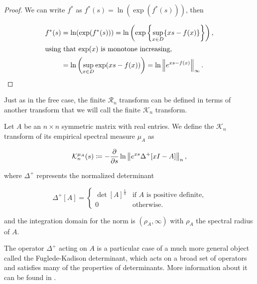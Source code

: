 \begin{proof}
    We can write $f^*$ as $f^*(s) = \ln(\exp(f^*(s)))$, then

    \begin{align*}
        f^*(s) &= \ln(\exp(f^*(s))) = \ln \left(\exp\left\{ \sup_{x\in D} \{xs-f(x)\} \right\}\right), \\
        \intertext{using that $\exp(x)$ is monotone increasing,}
        &= \ln \left( \sup_{x \in D} \exp(xs - f(x))\right) = \ln \left\lVert e^{xs-f(x)} \right\rVert_{\infty}.
    \end{align*}
\end{proof}


Just as in the free case, the finite $\mathcal R_n$ transform can be defined in terms of another transform that we will call the finite $\mathcal K_n$ transform.


\begin{definition}
    Let $A$ be an $n\times n$ symmetric matrix with real entries. We define the $\mathcal K_n$ transform of its empirical spectral measure $\mu_A$ as 

    \begin{equation*}
        \mathcal K_n^{\mu_A} (s) \coloneqq - \frac{\partial}{\partial s} \ln \left\lVert e^{xs} \Delta^+ [x I - A] \right\rVert_n,
    \end{equation*}

    \noindent where $\Delta^+$ represents the normalized determinant
    
    \begin{equation*}
        \Delta^+[A] = \left\{ \begin{array}{cc}
            \det[A]^{\frac1n} & \text{if $A$ is positive definite,}\\
            0 & \text{otherwise.}
        \end{array} \right.
    \end{equation*}
    
    \noindent and the integration domain for the norm is $(\rho_A, \infty)$ with $\rho_A$ the spectral radius of $A$.
\end{definition}

The operator $\Delta^+$ acting on $A$ is a particular case of a much more general object called the Fuglede-Kadison determinant, which acts on a broad set of operators and satisfies many of the properties of determinants. More information about it can be found in \cite{article:fuglede_kadisen_determinant}.

